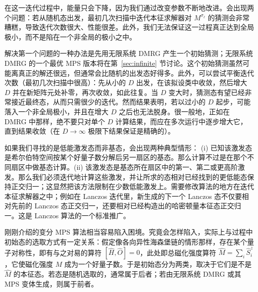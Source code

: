 在这一迭代过程中，能量只会下降，因为我们通过改变参数不断地改进。会出现两个问题：若从随机态出发，最初几次扫描中迭代本征求解器对 $M^{\sigma_\ell}$ 的猜测会非常糟糕，导致迭代次数很大、性能很差。此外，我们无法保证这一过程真正达到全局极小，而不是陷在一个非全局的极小之中。

解决第一个问题的一种办法是先用无限系统 DMRG 产生一个初始猜测；无限系统 DMRG 的一个最优 MPS 版本将在第~\ref{sec:infinite} 节讨论。这个初始猜测虽然可能离真正的解还很远，但通常会比随机的出发态好得多。此外，可以尝试平衡迭代次数（最初几次扫描中很高）：先从小的 $D$ 出发，在该拟设类中收敛，然后增大 $D$ 并在新矩阵元处补零，再次收敛，如此往复。当 $D$ 变大时，猜测态有望已经非常接近最终态，从而只需很少的迭代。然而结果表明，若以过小的 $D$ 起步，可能落入一个非全局极小，并且在增大 $D$ 之后也无法脱身。很一般地，正如在 DMRG 中那样，绝不要只对单个 $D$ 计算结果，而应在多次运行中逐步增大它，直到结果收敛（在 $D\rightarrow\infty$ 极限下结果保证是精确的）。

如果我们寻找的是低能激发态而非基态，会出现两种典型情形：
(i) 已知该激发态是希尔伯特空间按某个好量子数分解后另一扇区的基态。那么计算不过是在那个不同扇区中做基态计算。(ii) 该激发态是基态所在扇区中的第一、第二或更高阶激发。那么我们必须迭代地计算这些激发，并让所求的态相对已经找到的更低能态保持正交归一；这显然把该方法限制在少数低能激发上。需要修改算法的地方在迭代本征求解器之中；例如在 Lanczos 迭代里，新生成的下一个 Lanczos 态不仅要相对先前的 Lanczos 态正交归一，还要相对已经构造出的哈密顿量本征态正交归一。这是 Lanczos 算法的一个标准推广。

刚刚介绍的变分 MPS 算法相当容易陷入困境。究竟会怎样陷入，实际上与过程中初始态的选取方式有一定关系：假定像各向异性海森堡链的情形那样，存在某个量子对称性，即有与之对易的算符 $[\hat{H},\hat{O}]=0$，此处即总磁化强度算符 $\hat{M}=\sum_i \hat{S}^z_i$，它使磁化强度 $M$ 成为一个好量子数。于是初始态分为两类，取决于它们是不是 $\hat{M}$ 的本征态。若态是随机选取的，通常属于后者；若由无限系统 DMRG 或其 MPS 变体生成，则属于前者。

